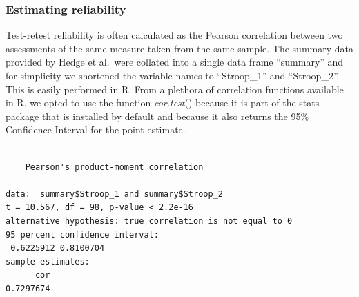 \documentclass[english,,man,floatsintext]{apa6}
\newenvironment{Shaded}{\begin{snugshade}}{\end{snugshade}}
\newcommand{\DecValTok}[1]{\textcolor[rgb]{0.00,0.00,0.81}{#1}}
\newcommand{\KeywordTok}[1]{\textcolor[rgb]{0.13,0.29,0.53}{\textbf{#1}}}
\newcommand{\NormalTok}[1]{#1}
\newcommand{\OperatorTok}[1]{\textcolor[rgb]{0.81,0.36,0.00}{\textbf{#1}}}
\begin{document}
\hypertarget{estimating-reliability}{%
\subsubsection{Estimating reliability}\label{estimating-reliability}}

Test-retest reliability is often calculated as the Pearson correlation between two assessments of the same measure taken from the same sample. The summary data provided by Hedge et al.~were collated into a single data frame \enquote{summary} and for simplicity we shortened the variable names to \enquote{Stroop\_1} and \enquote{Stroop\_2}. This is easily performed in R. From a plethora of correlation functions available in R, we opted to use the function \emph{cor.test}() because it is part of the stats package that is installed by default and because it also returns the 95\% Confidence Interval for the point estimate.

\newpage

\begin{Shaded}
\end{Shaded}

\begin{verbatim}

    Pearson's product-moment correlation

data:  summary$Stroop_1 and summary$Stroop_2
t = 10.567, df = 98, p-value < 2.2e-16
alternative hypothesis: true correlation is not equal to 0
95 percent confidence interval:
 0.6225912 0.8100704
sample estimates:
      cor 
0.7297674 
\end{verbatim}
\end{document}
